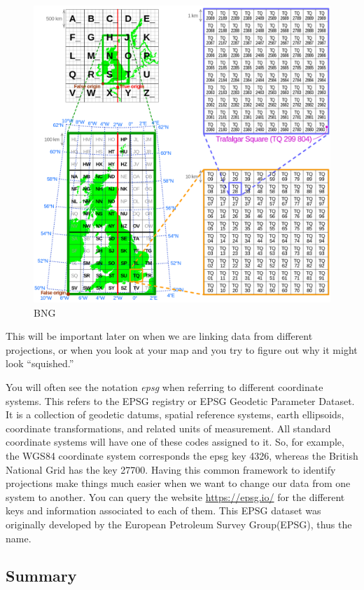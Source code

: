 \documentclass[
]{book}
\begin{document}
\begin{figure}
\centering
\includegraphics{img/Ordnance_Survey_National_Grid.svg.png}
\caption{BNG}
\end{figure}

This will be important later on when we are linking data from different projections, or when you look at your map and you try to figure out why it might look ``squished.''

You will often see the notation \emph{epsg} when referring to different coordinate systems. This refers to the EPSG registry or EPSG Geodetic Parameter Dataset. It is a collection of geodetic datums, spatial reference systems, earth ellipsoids, coordinate transformations, and related units of measurement. All standard coordinate systems will have one of these codes assigned to it. So, for example, the WGS84 coordinate system corresponds the epsg key 4326, whereas the British National Grid has the key 27700. Having this common framework to identify projections make things much easier when we want to change our data from one system to another. You can query the website \url{https://epsg.io/} for the different keys and information associated to each of them. This EPSG dataset was originally developed by the European Petroleum Survey Group(EPSG), thus the name.

\hypertarget{summary}{%
\subsection{Summary}\label{summary}}
\end{document}
